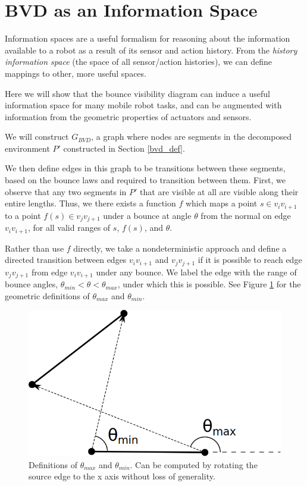 \documentclass[]{svproc}  %
\begin{document}
\section{BVD as an Information Space \label{bvd_info}}

Information spaces \cite{tovar2005information} are a useful formalism for
reasoning about the information available to a robot as a result of its sensor
and action history. From the \emph{history information space} (the space of all
sensor/action histories), we can define mappings to other, more useful spaces.

Here we will show that the bounce visibility diagram can induce a useful
information space for many mobile robot tasks, and can be augmented with
information from the geometric properties of actuators and sensors.

We will construct $G_{BVD}$, a graph where nodes are segments in the decomposed
environment $P'$ constructed in Section \ref{bvd_def}.

We then define edges in this graph to be transitions between these segments, based on the bounce laws and
required to transition between them. First, we observe that any two segments in
$P'$ that are visible at all are visible along their entire lengths. Thus, we
there exists a function $f$ which maps a point $s \in v_i
v_{i+1}$ to a point $f(s) \in v_j v_{j+1}$ under a bounce at angle $\theta$ from
the normal on edge $v_i v_{i+1}$, for all valid ranges of $s$, $f(s)$, and
$\theta$.

Rather than use $f$ directly, we take a nondeterministic approach and define a
directed transition between edges $v_i v_{i+1}$ and $v_j v_{j+1}$ if it is
possible to reach edge $v_j v_{j+1}$ from edge $v_i v_{i+1}$ under any bounce.
We label the edge with the range of bounce angles, $\theta_{min} < \theta <
\theta_{max}$, under which this is possible. See Figure \ref{fig:bounce_range} for
the geometric definitions of $\theta_{max}$ and $\theta_{min}$.

\begin{figure}
    \includegraphics[width=0.8\linewidth]{figures/bouncerange.png}
    \centering
    \caption{Definitions of $\theta_{max}$ and $\theta_{min}$. Can be computed
by rotating the source edge to the x axis without loss of generality.}\label{fig:bounce_range}
    \centering
\end{figure}
\end{document}
